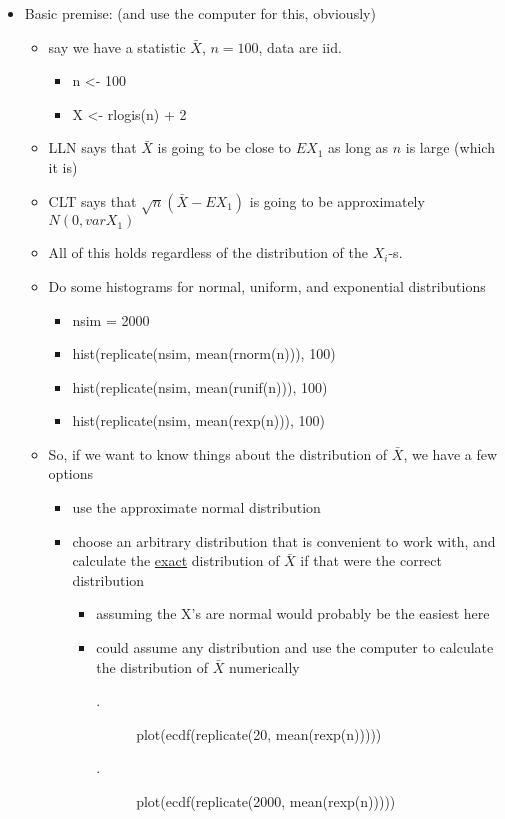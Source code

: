 \begin{itemize}
\item Basic premise: (and use the computer for this, obviously)
\begin{itemize}
\item say we have a statistic $\bar X$, $n = 100$, data are iid.
\begin{itemize}
\item n <- 100
\item X <- rlogis(n) + 2
\end{itemize}
\item LLN says that $\bar X$ is going to be close to $E X_1$ as long
       as $n$ is large (which it is)
\item CLT says that $\sqrt{n} (\bar X - E X_1)$ is going to be
       approximately $N(0, var X_1)$
\item All of this holds regardless of the distribution of the
       $X_i$-s.
\item Do some histograms for normal, uniform, and exponential distributions
\begin{itemize}
\item nsim = 2000
\item hist(replicate(nsim, mean(rnorm(n))), 100)
\item hist(replicate(nsim, mean(runif(n))), 100)
\item hist(replicate(nsim, mean(rexp(n))), 100)
\end{itemize}
\item So, if we want to know things about the distribution of $\bar
       X$, we have a few options
\begin{itemize}
\item use the approximate normal distribution
\item choose an arbitrary distribution that is convenient to work
         with, and calculate the \underline{exact} distribution of $\bar X$ if
         that were the correct distribution
\begin{itemize}
\item assuming the X's are normal would probably be the easiest here
\item could assume any distribution and use the computer to
           calculate the distribution of $\bar X$ numerically
\begin{description}
\item[.] plot(ecdf(replicate(20, mean(rexp(n)))))
\item[.] plot(ecdf(replicate(2000, mean(rexp(n)))))
\end{description}

\end{itemize}
\end{itemize}
\end{itemize}
\end{itemize}
